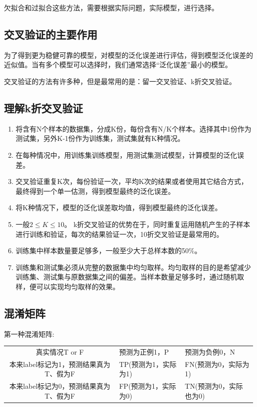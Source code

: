 欠拟合和过拟合这些方法，需要根据实际问题，实际模型，进行选择。

\subsection{交叉验证的主要作用}\label{ux4ea4ux53c9ux9a8cux8bc1ux7684ux4e3bux8981ux4f5cux7528}

​
为了得到更为稳健可靠的模型，对模型的泛化误差进行评估，得到模型泛化误差的近似值。当有多个模型可以选择时，我们通常选择``泛化误差''最小的模型。

​ 交叉验证的方法有许多种，但是最常用的是：留一交叉验证、k折交叉验证。

\subsection{理解k折交叉验证}\label{ux7406ux89e3kux6298ux4ea4ux53c9ux9a8cux8bc1}

\begin{enumerate}
\def\labelenumi{\arabic{enumi}.}
\item
  将含有N个样本的数据集，分成K份，每份含有N/K个样本。选择其中1份作为测试集，另外K-1份作为训练集，测试集就有K种情况。
\item
  在每种情况中，用训练集训练模型，用测试集测试模型，计算模型的泛化误差。
\item
  交叉验证重复K次，每份验证一次，平均K次的结果或者使用其它结合方式，最终得到一个单一估测，得到模型最终的泛化误差。
\item
  将K种情况下，模型的泛化误差取均值，得到模型最终的泛化误差。\\
\item
  一般$2\leqslant K \leqslant10$。
  k折交叉验证的优势在于，同时重复运用随机产生的子样本进行训练和验证，每次的结果验证一次，10折交叉验证是最常用的。
\item
  训练集中样本数量要足够多，一般至少大于总样本数的50\%。
\item
  训练集和测试集必须从完整的数据集中均匀取样。均匀取样的目的是希望减少训练集、测试集与原数据集之间的偏差。当样本数量足够多时，通过随机取样，便可以实现均匀取样的效果。
\end{enumerate}

\subsection{混淆矩阵}\label{ux6df7ux6dc6ux77e9ux9635}

第一种混淆矩阵:

\begin{longtable}[]{ cll }
真实情况T or F & 预测为正例1，P & 预测为负例0，N\tabularnewline
本来label标记为1，预测结果真为T、假为F & TP(预测为1，实际为1) &
FN(预测为0，实际为1)\tabularnewline
本来label标记为0，预测结果真为T、假为F & FP(预测为1，实际为0) &
TN(预测为0，实际也为0)\tabularnewline
\end{longtable}

